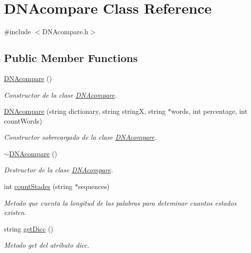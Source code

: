 \hypertarget{class_d_n_acompare}{\section{D\+N\+Acompare Class Reference}
\label{class_d_n_acompare}
}


{\ttfamily \#include $<$D\+N\+Acompare.\+h$>$}

\subsection*{Public Member Functions}
\begin{DoxyCompactItemize}
\item 
\hyperlink{class_d_n_acompare_afc7ea1cba3a91cdf7d6130c73461ce7c}{D\+N\+Acompare} ()
\begin{DoxyCompactList}\small\item\em Constructor de la clase \hyperlink{class_d_n_acompare}{D\+N\+Acompare}. \end{DoxyCompactList}\item 
\hyperlink{class_d_n_acompare_a1fdd0f41d40101045885825ebd9849e9}{D\+N\+Acompare} (string dictionary, string string\+X, string $\ast$words, int percentage, int count\+Words)
\begin{DoxyCompactList}\small\item\em Constructor sobrecargado de la clase \hyperlink{class_d_n_acompare}{D\+N\+Acompare}. \end{DoxyCompactList}\item 
\hyperlink{class_d_n_acompare_adff43389b52e963817bdb08076ce72be}{$\sim$\+D\+N\+Acompare} ()
\begin{DoxyCompactList}\small\item\em Destructor de la clase \hyperlink{class_d_n_acompare}{D\+N\+Acompare}. \end{DoxyCompactList}\item 
int \hyperlink{class_d_n_acompare_a8faa784e087dabfbbb29faa2c9ce0933}{count\+Stades} (string $\ast$sequences)
\begin{DoxyCompactList}\small\item\em Metodo que cuenta la longitud de las palabras para deteminar cuantos estados existen. \end{DoxyCompactList}\item 
string \hyperlink{class_d_n_acompare_ad6944ef2736f6cfcaeec7f07ea174b7c}{get\+Dicc} ()
\begin{DoxyCompactList}\small\item\em Metodo get del atributo dicc. \end{DoxyCompactList}\item 

\end{DoxyCompactItemize}
